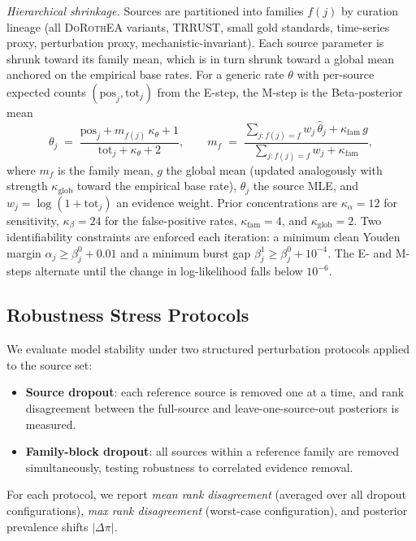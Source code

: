 \documentclass[11pt,a4paper]{article}
\begin{document}
{\emph{Hierarchical shrinkage.} Sources are partitioned into families $f(j)$ by curation
lineage (all \textsc{DoRothEA} variants, \textsc{TRRUST}, small gold standards,
time-series proxy, perturbation proxy, mechanistic-invariant). Each source parameter is
shrunk toward its family mean, which is in turn shrunk toward a global mean anchored on
the empirical base rates. For a generic rate $\theta$ with per-source expected counts
$(\mathrm{pos}_j,\mathrm{tot}_j)$ from the E-step, the M-step is the Beta-posterior mean
\begin{equation}
  \theta_j \;=\;
  \frac{\mathrm{pos}_j + m_{f(j)}\,\kappa_\theta + 1}
       {\mathrm{tot}_j + \kappa_\theta + 2},
  \qquad
  m_f \;=\;
  \frac{\sum_{j:f(j)=f} w_j\,\hat\theta_j + \kappa_{\mathrm{fam}}\,g}
       {\sum_{j:f(j)=f} w_j + \kappa_{\mathrm{fam}}},
\end{equation}
where $m_f$ is the family mean, $g$ the global mean (updated analogously with strength
$\kappa_{\mathrm{glob}}$ toward the empirical base rate), $\hat\theta_j$ the source MLE,
and $w_j=\log(1+\mathrm{tot}_j)$ an evidence weight. Prior concentrations are
$\kappa_\alpha{=}12$ for sensitivity, $\kappa_\beta{=}24$ for the false-positive rates,
$\kappa_{\mathrm{fam}}{=}4$, and $\kappa_{\mathrm{glob}}{=}2$. Two identifiability
constraints are enforced each iteration: a minimum clean Youden margin
$\alpha_j \ge \beta^0_j + 0.01$ and a minimum burst gap $\beta^1_j \ge \beta^0_j+10^{-4}$.
The E- and M-steps alternate until the change in log-likelihood falls below $10^{-6}$.
}

\subsection{Robustness Stress Protocols}\label{sec:robustness}

We evaluate model stability under two structured perturbation protocols applied to the source set:

\begin{itemize}
  \item \textbf{Source dropout}: each reference source is removed one at a time, and rank disagreement between the full-source and leave-one-source-out posteriors is measured.
  \item \textbf{Family-block dropout}: all sources within a reference family are removed simultaneously, testing robustness to correlated evidence removal.
\end{itemize}

For each protocol, we report \emph{mean rank disagreement} (averaged over all dropout configurations), \emph{max rank disagreement} (worst-case configuration), and posterior prevalence shifts $|\Delta\pi|$.
\end{document}

